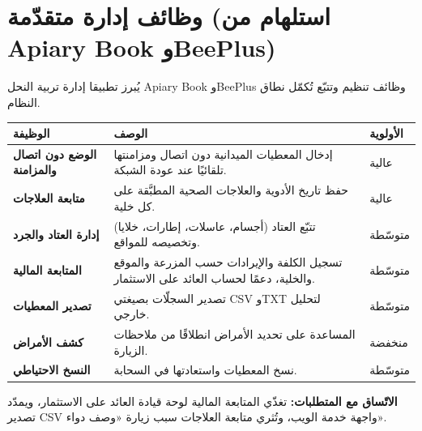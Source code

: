 \section{وظائف إدارة متقدّمة (استلهام من Apiary Book وBeePlus)}
يُبرز تطبيقا إدارة تربية النحل \textenglish{Apiary Book} و\textenglish{BeePlus}
وظائف تنظيم وتتبّع تُكمّل نطاق النظام.
\begin{xltabular}{\textwidth}{>{\bfseries}p{4.2cm} X C{2.1cm}}
\toprule
\textbf{الوظيفة} & \textbf{الوصف} & \textbf{الأولوية} \\
\midrule
\endhead
الوضع دون اتصال والمزامنة & إدخال المعطيات الميدانية دون اتصال ومزامنتها تلقائيًا عند عودة الشبكة. & عالية \\
متابعة العلاجات & حفظ تاريخ الأدوية والعلاجات الصحية المطبَّقة على كل خلية. & عالية \\
إدارة العتاد والجرد & تتبّع العتاد (أجسام، عاسلات، إطارات، خلايا) وتخصيصه للمواقع. & متوسّطة \\
المتابعة المالية & تسجيل الكلفة والإيرادات حسب المزرعة والموقع والخلية، دعمًا لحساب العائد على الاستثمار. & متوسّطة \\
تصدير المعطيات & تصدير السجلّات بصيغتي CSV وTXT لتحليل خارجي. & متوسّطة \\
كشف الأمراض & المساعدة على تحديد الأمراض انطلاقًا من ملاحظات الزيارة. & منخفضة \\
النسخ الاحتياطي & نسخ المعطيات واستعادتها في السحابة. & متوسّطة \\
\bottomrule
\end{xltabular}
\begin{encadre}
\textbf{الاتّساق مع المتطلبات:} تغذّي المتابعة المالية لوحة قيادة العائد على
الاستثمار، ويمدّد تصدير CSV واجهة خدمة الويب، وتُثري متابعة العلاجات سبب زيارة
«وصف دواء».
\end{encadre}

